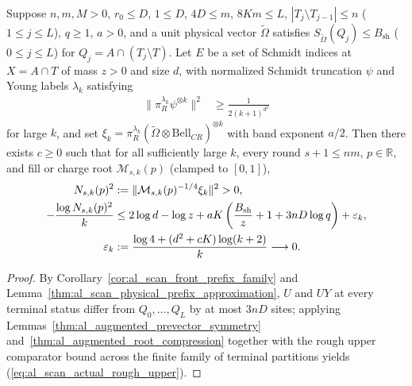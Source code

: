 \begin{lemma}
    \label{thm:al_scan_actual_rough_upper}
    \leanok
    Suppose $n,m,M>0$, $r_0\le D$, $1\le D$, $4D\le m$, $8Km\le L$,
    $|T_j\setminus T_{j-1}|\le n$ ($1\le j\le L$), $q\ge1$, $a>0$, and a unit
    physical vector $\widetilde\Omega$ satisfies
    $S_{\widetilde\Omega}(Q_j)\le B_{\mathrm{sh}}$ ($0\le j\le L$) for
    $Q_j=A\cap(T_j\setminus T)$. Let $E$ be a set of Schmidt indices at
    $X=A\cap T$ of mass $z>0$ and size $d$, with normalized Schmidt truncation
    $\psi$ and Young labels $\lambda_k$ satisfying
    \begin{align}
        \|\pi_R^{\lambda_k}\psi^{\otimes k}\|^2
         & \ge\frac{1}{2(k+1)^{d^2}}
        \label{eq:al_scan_rough_upper_isotypic_floor}
    \end{align}
    for large $k$, and set
    $\xi_k=\pi_R^{\lambda_k}(\widetilde\Omega\otimes\mathrm{Bell}_{CR})^{\otimes k}$
    with band exponent $a/2$. Then there exists $c\ge0$ such that for all
    sufficiently large $k$, every round $s+1\le nm$, $p\in\mathbb R$, and fill
    or charge root $\mathcal M_{s,k}(p)$ (clamped to $[0,1]$),
    \begin{align}
        N_{s,k}(p)^2
         & :=\|\mathcal M_{s,k}(p)^{-1/4}\xi_k\|^2>0, \notag                        \\
        -\frac{\log N_{s,k}(p)^2}{k}
         & \le 2\log d-\log z
        +aK\left(\frac{B_{\mathrm{sh}}}{z}+1+3nD\log q\right)+\varepsilon_k, \notag \\
        \varepsilon_k
         & :=\frac{\log4+(d^2+cK)\log(k+2)}{k}\longrightarrow0.
        \label{eq:al_scan_actual_rough_upper}
    \end{align}
\end{lemma}
\begin{proof}\leanok
    By Corollary~\ref{cor:al_scan_front_prefix_family} and
    Lemma~\ref{thm:al_scan_physical_prefix_approximation}, $U$ and $UY$ at
    every terminal status differ from $Q_0,\ldots,Q_L$ by at most $3nD$ sites;
    applying Lemmas~\ref{thm:al_augmented_prevector_symmetry}
    and~\ref{thm:al_augmented_root_compression} together with the rough upper
    comparator bound across the finite family of terminal partitions yields
    (\ref{eq:al_scan_actual_rough_upper}).
\end{proof}

